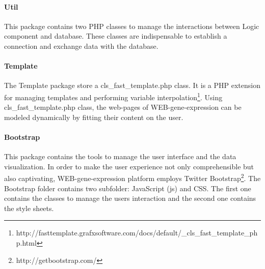 \documentclass[a4paper]{report}
\begin{document}
\paragraph{Util} This package contains two PHP classes to manage the interactions between Logic component and database. These classes are indispensable to establish a connection and exchange data with the database.

\paragraph{Template} The Template package store a cls\_fast\_template.php class. It is a PHP extension for managing templates and performing variable interpolation\footnote{http://fasttemplate.grafxsoftware.com/docs/default/\_cls\_fast\_template\_php.html}.
Using cls\_fast\_template.php class, the web-pages of WEB-gene-expression can be modeled dynamically by fitting their content on the user.

\paragraph{Bootstrap} This package contains the tools to manage the user interface and the data visualization. In order to make the user experience not only comprehensible but also captivating, WEB-gene-expression platform employs Twitter Bootstrap\footnote{http://getbootstrap.com/}. The Bootstrap folder contains two subfolder: JavaScript (js) and CSS. The first one contains the classes to manage the users interaction and the second one contains the style sheets. 
\end{document}
